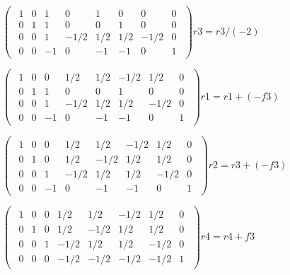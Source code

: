 \singlespacing

\begin{math}
    \begin{pmatrix}
        \begin{array}{cccc|cccc}
            1 & 0 & 1  & 0    & 1   & 0   & 0    & 0 \\
            0 & 1 & 1  & 0    & 0   & 1   & 0    & 0 \\
            0 & 0 & 1  & -1/2 & 1/2 & 1/2 & -1/2 & 0 \\
            0 & 0 & -1 & 0    & -1  & -1  & 0    & 1
        \end{array}
    \end{pmatrix}
    r3 = r3 / (-2)
\end{math}

\singlespacing

\begin{math}
    \begin{pmatrix}
        \begin{array}{cccc|cccc}
            1 & 0 & 0  & 1/2  & 1/2 & -1/2 & 1/2  & 0 \\
            0 & 1 & 1  & 0    & 0   & 1    & 0    & 0 \\
            0 & 0 & 1  & -1/2 & 1/2 & 1/2  & -1/2 & 0 \\
            0 & 0 & -1 & 0    & -1  & -1   & 0    & 1
        \end{array}
    \end{pmatrix}
    r1 = r1 + (-f3)
\end{math}

\singlespacing

\begin{math}
    \begin{pmatrix}
        \begin{array}{cccc|cccc}
            1 & 0 & 0  & 1/2  & 1/2  & -1/2 & 1/2  & 0 \\
            0 & 1 & 0  & 1/2  & -1/2 & 1/2  & 1/2  & 0 \\
            0 & 0 & 1  & -1/2 & 1/2  & 1/2  & -1/2 & 0 \\
            0 & 0 & -1 & 0    & -1   & -1   & 0    & 1
        \end{array}
    \end{pmatrix}
    r2 = r3 + (-f3)
\end{math}

\singlespacing

\begin{math}
    \begin{pmatrix}
        \begin{array}{cccc|cccc}
            1 & 0 & 0 & 1/2  & 1/2  & -1/2 & 1/2  & 0 \\
            0 & 1 & 0 & 1/2  & -1/2 & 1/2  & 1/2  & 0 \\
            0 & 0 & 1 & -1/2 & 1/2  & 1/2  & -1/2 & 0 \\
            0 & 0 & 0 & -1/2 & -1/2 & -1/2 & -1/2 & 1
        \end{array}
    \end{pmatrix}
    r4 = r4 + f3
\end{math}

